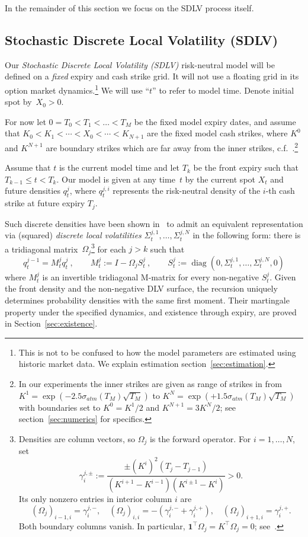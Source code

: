 \documentclass[11pt]{article}
\newcommand{\one}{\mathbf 1}
\theoremstyle{plain}
\theoremstyle{definition}
\theoremstyle{remark}
\begin{document}
In the remainder of this section we focus on the SDLV process itself.

\subsection{Stochastic Discrete Local Volatility (SDLV)}

Our \emph{Stochastic Discrete Local Volatility (SDLV)} risk-neutral model will be defined on a \emph{fixed} expiry and cash strike grid. It will not use a floating grid in its option market dynamics.\footnote{This is not to be confused to 
how the model parameters are estimated using historic market data. We explain estimation section~\ref{sec:estimation}.} We will use ``$t$'' to refer to 
model time. Denote initial spot by~$X_0>0$.

For now let $0=T_0<T_1<\dots<T_M$ be the fixed model expiry dates, and assume that $K_0<K_1<\cdots<X_0<\cdots<K_{N+1}$ are the fixed model cash strikes, where 
$K^0$ and $K^{N+1}$
are boundary strikes which are far away from the inner strikes, c.f.~\cite{SANOS2026}.\footnote{In our experiments the inner strikes are given as range of strikes
in from $K^1=\exp(-2.5 \sigma_{atm}(T_M) \sqrt{T_M})$ to $K^N=\exp(+1.5 \sigma_{atm}(T_M) \sqrt{T_M})$ with boundaries set to $K^0=K^1/2$ and $K^{N+1}=3 K^N / 2$; see
section~\ref{sec:numerics} for specifics.
}

Assume that $t$ is the current model time and let $T_k$ be the front expiry such that $T_{k-1}\leq t<T_k$.
Our model is given at any time~$t$
by the current spot $X_t$ and future densities $q_t^j$, where $q_t^{j,i}$ represents the risk-neutral density of the $i$-th cash strike at future expiry $T_j$.

Such discrete densities have been shown in~\cite{BuehlerRyskin2016} to admit an equivalent representation via (squared) \emph{discrete local volatilities} $\Sigma_t^{j,1},\ldots,\Sigma_t^{j,N}$ in the following form:
there is a tridiagonal matrix~$\Omega_j$\footnote{
Densities are column vectors, so $\Omega_j$ is the forward operator.
For $i=1,\ldots,N$, set
\[
 \gamma_i^{j,\pm}:=
 \frac{\pm(K^i)^2(T_j-T_{j-1})}
 {(K^{i+1}-K^{i-1})(K^{i\pm1}-K^i)}>0.
\]
Its only nonzero entries in interior column $i$ are
\[
 (\Omega_j)_{i-1,i}=\gamma_i^{j,-},\quad
 (\Omega_j)_{i,i}=-(\gamma_i^{j,-}+\gamma_i^{j,+}),\quad
 (\Omega_j)_{i+1,i}=\gamma_i^{j,+}.
\]
Both boundary columns vanish. In particular,
$\one^\top\Omega_j=K^\top\Omega_j=0$; see~\cite{SANOS2026}.
} for each $j>k$ such that 
\begin{equation}
q_t^{j-1}=M_t^jq_t^j \ ,
\qquad
M_t^j:=I-\Omega_jS_t^j \ ,
\qquad
S_t^j:=\operatorname{diag}(0,\Sigma_t^{j,1},\ldots,
\Sigma_t^{j,N},0) 
\label{eq:hb_dlv}
\end{equation}
where $M^j_t$ is an invertible tridiagonal M-matrix for every non-negative $S_t^j$.
Given the front density and the non-negative DLV surface, the recursion uniquely determines
probability densities with the same first moment. Their martingale property under the
specified dynamics, and existence through expiry, are proved in Section~\ref{sec:existence}.
\end{document}
